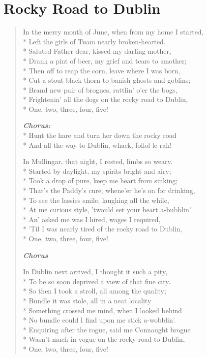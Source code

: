 \documentclass[9pt,twoside]{extarticle}
\newenvironment{xverse}{
	\begin{verse}
	\fontsize{8.5}{10.5}\selectfont
	}
	{
	\end{verse}
	\penalty 0
}
\newcommand{\chorusdef}{\textbf{\emph{Chorus:}}\\*}
\newcommand{\chorusmark}[1][1]{%
\vspace{-0.5\stanzaskip}%
\textbf{\emph{Chorus \ifthenelse{\equal{#1}{1}}{}{$\times$ #1}}}%
\vspace{-0.5\stanzaskip}%
}
\begin{document}
\section{Rocky Road to Dublin}

\begin{xverse}
In the merry month of June, when from my home I started, \\*
Left the girls of Tuam nearly broken-hearted. \\*
Saluted Father dear, kissed my darling mother, \\*
Drank a pint of beer, my grief and tears to smother; \\*
Then off to reap the corn, leave where I was born, \\*
Cut a stout black-thorn to banish ghosts and goblins; \\*
Brand new pair of brogues, rattlin’ o’er the bogs, \\*
Frightenin’ all the dogs on the rocky road to Dublin, \\*
One, two, three, four, five!

\chorusdef
Hunt the hare and turn her down the rocky road \\*
And all the way to Dublin, whack, follol le-rah!

In Mullingar, that night, I rested, limbs so weary. \\*
Started by daylight, my spirits bright and airy; \\*
Took a drop of pure, keep me heart from sinking; \\*
That’s the Paddy’s cure, whene’er he’s on for drinking, \\*
To see the lassies smile, laughing all the while, \\*
At me curious style, ’twould set your heart a-bubblin’ \\*
An’ asked me was I hired, wages I required, \\*
’Til I was nearly tired of the rocky road to Dublin, \\*
One, two, three, four, five!

\chorusmark

In Dublin next arrived, I thought it such a pity, \\*
To be so soon deprived a view of that fine city. \\*
So then I took a stroll, all among the quality; \\*
Bundle it was stole, all in a neat locality \\*
Something crossed me mind, when I looked behind \\*
No bundle could I find upon me stick a-wobblin’. \\*
Enquiring after the rogue, said me Connaught brogue \\*
Wasn’t much in vogue on the rocky road to Dublin, \\*
One, two, three, four, five!


\end{xverse}
\end{document}
